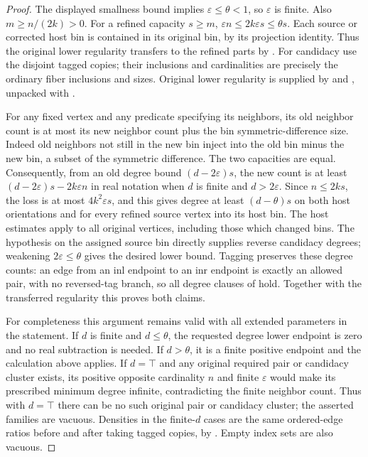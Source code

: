 \begin{proof}
The displayed smallness bound implies $\varepsilon\leq\theta<1$,
so $\varepsilon$ is finite. Also $m\geq n/(2k)>0$.
For a refined capacity $s\geq m$,
$\varepsilon n\leq2k\varepsilon s\leq\theta s$.
Each source or corrected host bin is contained in its original bin,
by its projection identity. Thus the original lower regularity
transfers to the refined parts by .
For candidacy use the disjoint tagged copies; their inclusions and
cardinalities are precisely the ordinary fiber inclusions and sizes.
Original lower regularity is supplied by
 and
, unpacked with
.

For any fixed vertex and any predicate specifying its neighbors,
its old neighbor count is at most its new neighbor count plus the
bin symmetric-difference size. Indeed old neighbors not still in
the new bin inject into the old bin minus the new bin, a subset
of the symmetric difference. The two capacities are equal.
Consequently, from an old degree bound $(d-2\varepsilon)s$,
the new count is at least $(d-2\varepsilon)s-2k\varepsilon n$
in real notation when $d$ is finite and $d>2\varepsilon$.
Since $n\leq2ks$, the loss is at most $4k^2\varepsilon s$,
and this gives degree at least $(d-\theta)s$ on both host
orientations and for every refined source vertex into its host bin.
The host estimates apply to all original vertices, including those
which changed bins. The hypothesis on the assigned source bin
directly supplies reverse candidacy degrees; weakening
$2\varepsilon\leq\theta$ gives the desired lower bound.
Tagging preserves these degree counts: an edge from an inl endpoint
to an inr endpoint is exactly an allowed pair, with no reversed-tag
branch, so all degree clauses of 
hold. Together with the transferred regularity this proves both claims.

For completeness this argument remains valid with all extended
parameters in the statement. If $d$ is finite and $d\leq\theta$,
the requested degree lower endpoint is zero and no real subtraction
is needed. If $d>\theta$, it is a finite positive endpoint and the
calculation above applies. If $d=\top$ and any original required
pair or candidacy cluster exists, its positive opposite cardinality
$n$ and finite $\varepsilon$ would make its prescribed minimum degree
infinite, contradicting the finite neighbor count. Thus with $d=\top$
there can be no such original pair or candidacy cluster; the asserted
families are vacuous. Densities in the finite-$d$ cases are the same
ordered-edge ratios before and after taking tagged copies, by
. Empty index sets are also vacuous.
\end{proof}

